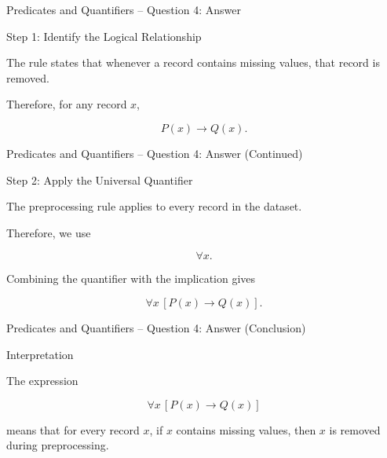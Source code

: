 \begin{frame}{Predicates and Quantifiers -- Question 4: Answer}

\begin{exampleblock}{Step 1: Identify the Logical Relationship}

The rule states that whenever a record contains missing values, that
record is removed.

Therefore, for any record $x$,

$$
P(x)\rightarrow Q(x).
$$

\end{exampleblock}

\end{frame}


\begin{frame}{Predicates and Quantifiers -- Question 4: Answer (Continued)}

\begin{exampleblock}{Step 2: Apply the Universal Quantifier}

The preprocessing rule applies to every record in the dataset.

Therefore, we use

$$
\forall x.
$$

Combining the quantifier with the implication gives

$$
\boxed{\forall x\,[P(x)\rightarrow Q(x)]}.
$$

\end{exampleblock}

\end{frame}


\begin{frame}{Predicates and Quantifiers -- Question 4: Answer (Conclusion)}

\begin{exampleblock}{Interpretation}

The expression

$$
\forall x\,[P(x)\rightarrow Q(x)]
$$

means that for every record $x$, if $x$ contains missing values, then
$x$ is removed during preprocessing.

\end{exampleblock}

\end{frame}

